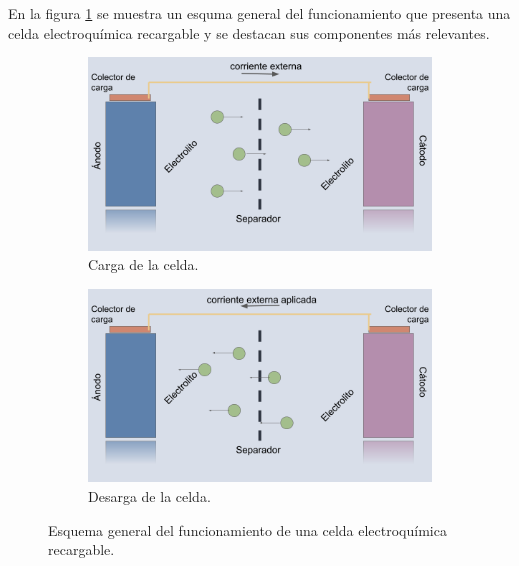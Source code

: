 En la figura \ref{fig:bateria} se muestra un esquma general del funcionamiento 
que presenta una celda electroquímica recargable y se destacan sus componentes 
más relevantes.
\begin{figure}[h]
    \centering
    \begin{subfigure}{.8\textwidth}
        \centering
        \includegraphics[width=\textwidth]{introduccion/baterias/bateria-carga.png}
        \caption{Carga de la celda.}
    \end{subfigure}
    \hfill
    \begin{subfigure}{.8\textwidth}
        \centering
        \includegraphics[width=\textwidth]{introduccion/baterias/bateria-descarga.png}
        \caption{Desarga de la celda.}
    \end{subfigure}
    \caption{Esquema general del funcionamiento de una celda electroquímica 
    recargable.}
    \label{fig:bateria}
\end{figure}


